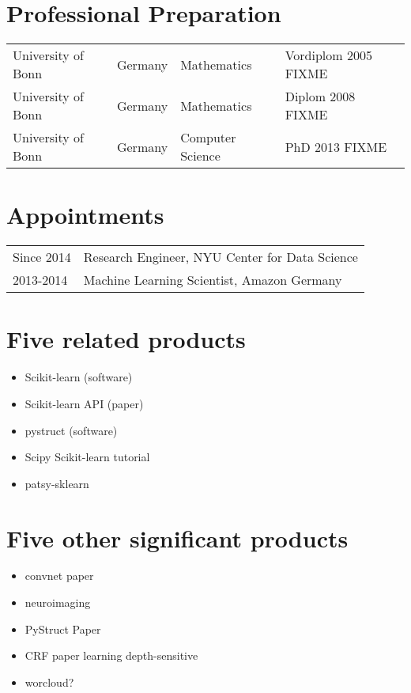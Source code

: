 

\section*{Professional Preparation}
\begin{tabular}{ l l l l}
University of Bonn& Germany& Mathematics     &  Vordiplom 2005 FIXME\\
University of Bonn& Germany& Mathematics     &  Diplom 2008 FIXME\\
University of Bonn& Germany& Computer Science&  PhD 2013 FIXME\\
\end{tabular}

\section*{Appointments}
\begin{tabular}{ l l }
Since 2014& Research Engineer, NYU Center for Data Science\\
2013-2014& Machine Learning Scientist, Amazon Germany\\
\end{tabular}

\section*{Five related products}
\begin{itemize}
    \item Scikit-learn (software)
    \item Scikit-learn API (paper)
    \item pystruct (software)
    \item Scipy Scikit-learn tutorial
    \item patsy-sklearn
\end{itemize}

\section*{Five other significant products}
\begin{itemize}
    \item convnet paper
    \item neuroimaging
    \item PyStruct Paper
    \item CRF paper learning depth-sensitive
    \item worcloud?
\end{itemize}

